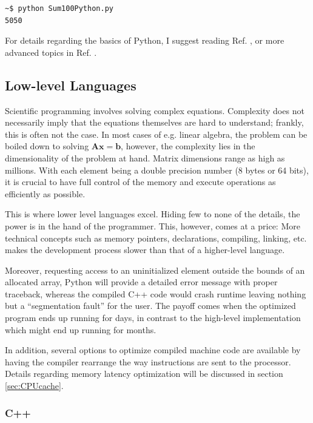 


\begin{verbatim}
~$ python Sum100Python.py 
5050
\end{verbatim}

 For details regarding the basics of Python, I suggest reading Ref. \cite{inf1100}, or more advanced topics in Ref. \cite{inf3331}.  


\subsection{Low-level Languages}
\label{sec:lowlevel}

Scientific programming involves solving complex equations. Complexity does not necessarily imply that the equations themselves are hard to understand; frankly, this is often not the case. In most cases of e.g. linear algebra, the problem can be boiled down to solving $\mathbf{A}\mathbf{x} = \mathbf{b}$, however, the complexity lies in the dimensionality of the problem at hand. Matrix dimensions range as high as millions. With each element being a double precision number (8 bytes or 64 bits), it is crucial to have full control of the memory and execute operations as efficiently as possible. 

This is where lower level languages excel. Hiding few to none of the details, the power is in the hand of the programmer. This, however, comes at a price: More technical concepts such as memory pointers, declarations, compiling, linking, etc. makes the development process slower than that of a higher-level language. 

Moreover, requesting access to an uninitialized element outside the bounds of an allocated array, Python will provide a detailed error message with proper traceback, whereas the compiled C++ code would crash runtime leaving nothing but a ``segmentation fault'' for the user. The payoff comes when the optimized program ends up running for days, in contrast to the high-level implementation which might end up running for months.

In addition, several options to optimize compiled machine code are available by having the compiler rearrange the way instructions are sent to the processor. Details regarding memory latency optimization will be discussed in section \ref{sec:CPUcache}. 

\subsubsection{C++}

